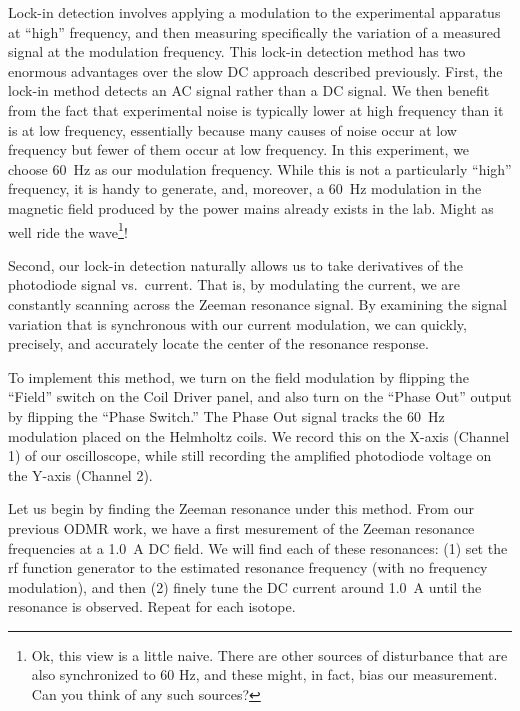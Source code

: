 \documentclass{../lab}
\begin{document}
Lock-in detection involves applying a modulation to the experimental apparatus at ``high'' frequency, and then measuring specifically the variation of a measured signal at the modulation frequency.  This lock-in detection method has two enormous advantages over the slow DC approach described previously.  First, the lock-in method detects an AC signal rather than a DC signal.  We then benefit from the fact that experimental noise is typically lower at high frequency than it is at low frequency, essentially because many causes of noise occur at low frequency but fewer of them occur at low frequency.  In this experiment, we choose 60~Hz as our  modulation frequency. While this is not a particularly ``high'' frequency, it is handy to generate, and, moreover, a 60~Hz modulation in the magnetic field produced by the power mains already exists in the lab.  Might as well ride the wave\footnote{Ok, this view is a little naive.  There are other sources of disturbance that are also synchronized to 60 Hz, and these might, in fact, bias our measurement.  Can you think of any such sources?}!

 
Second, our lock-in detection naturally allows us to take derivatives of the photodiode signal vs.\ current.  That is, by modulating the current, we are constantly scanning across the Zeeman resonance signal.  By examining the signal variation that is synchronous with our current modulation, we can quickly, precisely, and accurately locate the center of the resonance response.

To implement this method, we turn on the field modulation by flipping the ``Field'' switch on the Coil Driver panel, and also turn on the ``Phase Out'' output by flipping the ``Phase Switch.''  The Phase Out signal tracks the 60~Hz modulation placed on the Helmholtz coils.  We record this on the X-axis (Channel 1) of our oscilloscope, while still recording the amplified photodiode voltage on the Y-axis (Channel 2).

Let us begin by finding the Zeeman resonance under this method.  From our previous ODMR work, we have a first mesurement of the Zeeman resonance frequencies at a 1.0~A DC field.  We will find each of these resonances:  (1) set the rf function generator to the estimated resonance frequency (with no frequency modulation), and then (2) finely tune the DC current around 1.0~A until the resonance is observed.  Repeat for each isotope.
\end{document}
